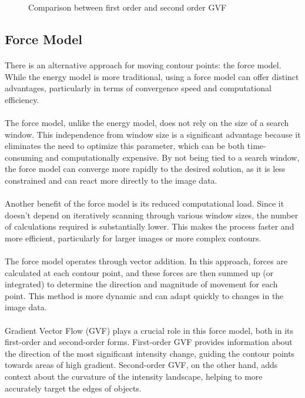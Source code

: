 \documentclass[12pt,a4paper]{report}
\begin{document}
\begin{figure}[!]
\begin{minipage}{\linewidth}
        \caption{Comparison between first order and second order GVF}
    \end{minipage}

\end{figure}

\clearpage

\subsection{Force Model}
\paragraph*{}
There is an alternative approach for moving contour points: the force model. While the energy model is more traditional, using a force model can offer distinct advantages, particularly in terms of convergence speed and computational efficiency.
\paragraph*{}
The force model, unlike the energy model, does not rely on the size of a search window. This independence from window size is a significant advantage because it eliminates the need to optimize this parameter, which can be both time-consuming and computationally expensive. By not being tied to a search window, the force model can converge more rapidly to the desired solution, as it is less constrained and can react more directly to the image data.
\paragraph*{}
Another benefit of the force model is its reduced computational load. Since it doesn't depend on iteratively scanning through various window sizes, the number of calculations required is substantially lower. This makes the process faster and more efficient, particularly for larger images or more complex contours.
\paragraph*{}
The force model operates through vector addition. In this approach, forces are calculated at each contour point, and these forces are then summed up (or integrated) to determine the direction and magnitude of movement for each point. This method is more dynamic and can adapt quickly to changes in the image data.
\paragraph*{}
Gradient Vector Flow (GVF) plays a crucial role in this force model, both in its first-order and second-order forms. First-order GVF provides information about the direction of the most significant intensity change, guiding the contour points towards areas of high gradient. Second-order GVF, on the other hand, adds context about the curvature of the intensity landscape, helping to more accurately target the edges of objects.
\end{document}
